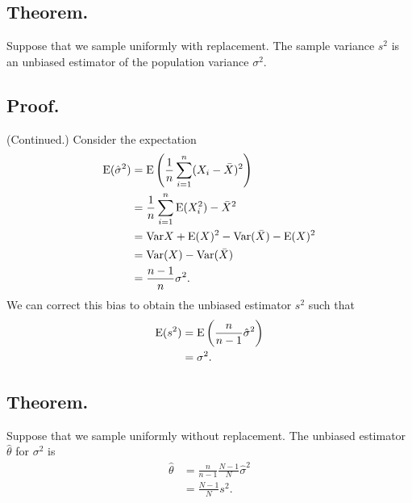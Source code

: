 \documentclass[titlepage]{article}
\begin{document}
\subsection{Theorem.} Suppose that we sample uniformly with replacement. The sample variance $s^{2}$ is an unbiased estimator of the population variance $\sigma^{2}$.

\subsection{Proof.} (Continued.) Consider the expectation 
\begin{align*}
    \text{E}(\hat{\sigma}^{2}) &= \text{E}\left(\frac{1}{n}\sum_{i=1}^{n}(X_{i} - \bar{X})^{2}\right) \\
                         &= \frac{1}{n}\sum_{i=1}^{n}\text{E}(X_{i}^{2}) - \bar{X}^{2} \\
                         &= \text{Var}{X} + \text{E}(X)^{2} - \text{Var}(\bar{X}) - \text{E}(X)^{2} \\
                         &= \text{Var}(X) - \text{Var}(\bar{X}) \\
                         &= \frac{n-1}{n}\sigma^{2}.
\end{align*}
We can correct this bias to obtain the unbiased estimator $s^{2}$ such that 
\begin{align*}
    \text{E}(s^{2}) &= \text{E}\left(\frac{n}{n-1}\hat{\sigma}^{2}\right) \\
              &= \sigma^{2}.
\end{align*}

\subsection{Theorem.} Suppose that we sample uniformly without replacement. The unbiased estimator $\hat{\theta}$ for $\sigma^{2}$ is 
\begin{align*}
    \hat{\theta} &= \frac{n}{n-1}\frac{N-1}{N}\hat{\sigma}^{2} \\
                 &= \frac{N-1}{N}s^{2}.
\end{align*}
\end{document}
